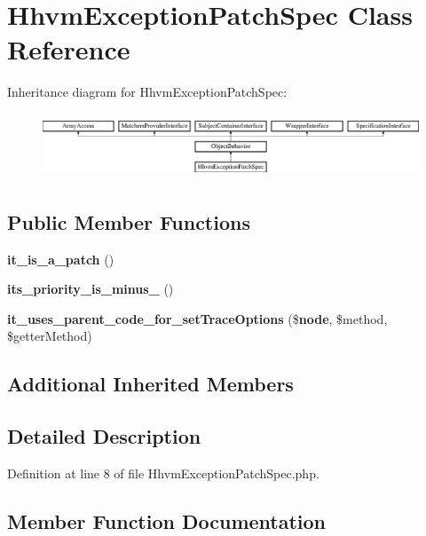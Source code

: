 \section{Hhvm\+Exception\+Patch\+Spec Class Reference}
\label{classspec_1_1_prophecy_1_1_doubler_1_1_class_patch_1_1_hhvm_exception_patch_spec}
Inheritance diagram for Hhvm\+Exception\+Patch\+Spec\+:\begin{figure}[H]
\begin{center}
\leavevmode
\includegraphics[height=1.953488cm]{classspec_1_1_prophecy_1_1_doubler_1_1_class_patch_1_1_hhvm_exception_patch_spec}
\end{center}
\end{figure}
\subsection*{Public Member Functions}
\begin{DoxyCompactItemize}
\item 
{\bf it\+\_\+is\+\_\+a\+\_\+patch} ()
\item 
{\bf its\+\_\+priority\+\_\+is\+\_\+minus\+\_} ()
\item 
{\bf it\+\_\+uses\+\_\+parent\+\_\+code\+\_\+for\+\_\+set\+Trace\+Options} (\${\bf node}, \$method, \$getter\+Method)
\end{DoxyCompactItemize}
\subsection*{Additional Inherited Members}


\subsection{Detailed Description}


Definition at line 8 of file Hhvm\+Exception\+Patch\+Spec.\+php.



\subsection{Member Function Documentation}
